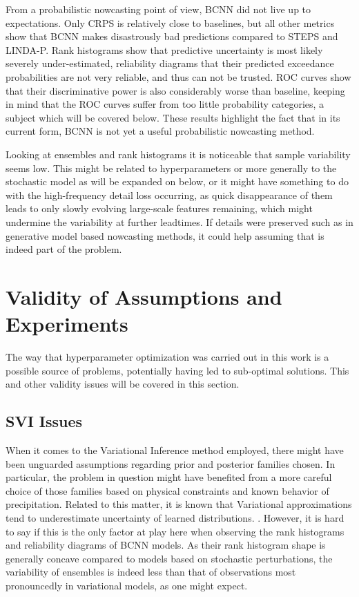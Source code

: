 From a probabilistic nowcasting point of view, BCNN did not live up to expectations. Only CRPS is relatively close to baselines, but all other metrics show that BCNN makes disastrously bad predictions compared to STEPS and LINDA-P. Rank histograms show that predictive uncertainty is most likely severely under-estimated, reliability diagrams that their predicted exceedance probabilities are not very reliable, and thus can not be trusted. ROC curves show that their discriminative power is also considerably worse than baseline, keeping in mind that the ROC curves suffer from too little probability categories, a subject which will be covered below. These results highlight the fact that in its current form, BCNN is not yet a useful probabilistic nowcasting method.

Looking at ensembles and rank histograms it is noticeable that sample variability seems low. This might be related to hyperparameters or more generally to the stochastic model as will be expanded on below, or it might have something to do with the high-frequency detail loss occurring, as quick disappearance of them leads to only slowly evolving large-scale features remaining, which might undermine the variability at further leadtimes. If details were preserved such as in generative model based nowcasting methods, it could help assuming that is indeed part of the problem. 


\section{Validity of Assumptions and Experiments}

The way that hyperparameter optimization was carried out in this work is a possible source of problems, potentially having led to sub-optimal solutions. This and other validity issues will be covered in this section.

\subsection{SVI Issues}

When it comes to the Variational Inference method employed, there might have been unguarded assumptions regarding prior and posterior families chosen. In particular, the problem in question might have benefited from a more careful choice of those families based on physical constraints and known behavior of precipitation.   
Related to this matter, it is known that Variational approximations tend to underestimate uncertainty of learned distributions. \cite{bishop2006pattern, minka_family_nodate}. However, it is hard to say if this is the only factor at play here when observing the rank histograms and reliability diagrams of BCNN models. As their rank histogram shape is generally concave compared to models based on stochastic perturbations, the variability of ensembles is indeed less than that of observations most pronouncedly in variational models, as one might expect. 


